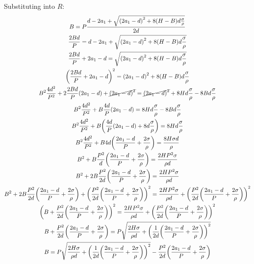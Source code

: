 \documentclass{article}
\begin{document}
Substituting into $R$:
\begin{gather}
    B = P \frac{d - 2 a_1 + \sqrt{\parens*{2 a_1 - d}^2 + 8 \parens*{H - B} d \frac{\sigma}{\rho} }}{2 d}
    \\
    \frac{2Bd}{P} = d - 2 a_1 + \sqrt{\parens*{2 a_1 - d}^2 + 8 \parens*{H - B} d \frac{\sigma}{\rho} }
    \\
    \frac{2Bd}{P} + 2 a_1 - d = \sqrt{\parens*{2 a_1 - d}^2 + 8 \parens*{H - B} d \frac{\sigma}{\rho} }
    \\
    \parens*{\frac{2Bd}{P} + 2 a_1 - d}^2 = \parens*{2 a_1 - d}^2 + 8 \parens*{H - B} d \frac{\sigma}{\rho}
    \\
    B^2 \frac{4 d^2}{P^2} + 2 \frac{2Bd}{P} \parens*{2 a_1 - d} + \cancel{\parens*{2 a_1 - d}^2}
        = \cancel{\parens*{2 a_1 - d}^2} + 8 H d \frac{\sigma}{\rho} - 8 B d \frac{\sigma}{\rho}
    \\
    B^2 \frac{4 d^2}{P^2} + B \frac{4 d}{P} \parens*{2 a_1 - d}
        = 8 H d \frac{\sigma}{\rho} - 8 B d \frac{\sigma}{\rho}
    \\
    B^2 \frac{4 d^2}{P^2} + B \parens*{\frac{4 d}{P} \parens*{2 a_1 - d} + 8 d \frac{\sigma}{\rho}}
        = 8 H d \frac{\sigma}{\rho}
    \\
    B^2 \frac{4 d^2}{P^2} + B 4 d \parens*{\frac{2 a_1 - d}{P} + \frac{2 \sigma}{\rho}}
        = \frac{8 H \sigma d}{\rho}
    \\
    B^2 + B \frac{P^2}{d} \parens*{\frac{2 a_1 - d}{P} + \frac{2 \sigma}{\rho}}
        = \frac{2 H P^2 \sigma}{\rho d}
    \\
    B^2 + 2 B \frac{P^2}{2d} \parens*{\frac{2 a_1 - d}{P} + \frac{2 \sigma}{\rho}}
        = \frac{2 H P^2 \sigma}{\rho d}
    \\
    B^2 + 2 B \frac{P^2}{2d} \parens*{\frac{2 a_1 - d}{P} + \frac{2 \sigma}{\rho}}
        + \parens*{\frac{P^2}{2d} \parens*{\frac{2 a_1 - d}{P} + \frac{2 \sigma}{\rho}}}^2
        = \frac{2 H P^2 \sigma}{\rho d}
        + \parens*{\frac{P^2}{2d} \parens*{\frac{2 a_1 - d}{P} + \frac{2 \sigma}{\rho}}}^2
    \\
    \parens*{B + \frac{P^2}{2d} \parens*{\frac{2 a_1 - d}{P} + \frac{2 \sigma}{\rho}}}^2
        = \frac{2 H P^2 \sigma}{\rho d}
        + \parens*{\frac{P^2}{2d} \parens*{\frac{2 a_1 - d}{P} + \frac{2 \sigma}{\rho}}}^2
    \\
    B + \frac{P^2}{2d} \parens*{\frac{2 a_1 - d}{P} + \frac{2 \sigma}{\rho}}
        = P \sqrt{
            \frac{2 H \sigma}{\rho d}
            + \parens*{\frac{1}{2d} \parens*{\frac{2 a_1 - d}{P} + \frac{2 \sigma}{\rho}}}^2
        }
    \\
    B
        = P \sqrt{
            \frac{2 H \sigma}{\rho d}
            + \parens*{\frac{1}{2d} \parens*{\frac{2 a_1 - d}{P} + \frac{2 \sigma}{\rho}}}^2
        }
        - \frac{P^2}{2d} \parens*{\frac{2 a_1 - d}{P} + \frac{2 \sigma}{\rho}}
        \label{eq:total_blast}
\end{gather}
\end{document}
